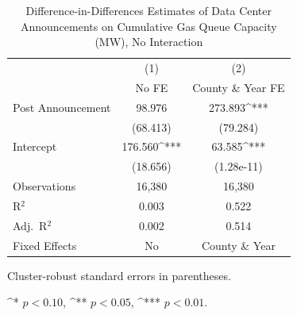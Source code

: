 \documentclass[sigconf,authordraft]{acmart}
\newcommand{\sym}[1]{^{#1}}
\begin{document}
\begin{table}[htbp]\centering
\caption{Difference-in-Differences Estimates of Data Center Announcements on Cumulative Gas Queue Capacity (MW), No Interaction}
\begin{threeparttable}
\begin{tabular}{lcc}
\toprule
& (1) & (2) \\
& No FE & County \& Year FE \\
\midrule
Post Announcement & 98.976 & 273.893\sym{***} \\
& (68.413) & (79.284) \\
Intercept & 176.560\sym{***} & 63.585\sym{***} \\
& (18.656) & (1.28e-11) \\
\midrule
Observations & 16,380 & 16,380 \\
R$^2$ & 0.003 & 0.522 \\
Adj.\ R$^2$ & 0.002 & 0.514 \\
Fixed Effects & No & County \& Year \\
\bottomrule
\end{tabular}
\begin{tablenotes}[flushleft]
\footnotesize
\item Cluster-robust standard errors in parentheses. 
\item \sym{*} $p<0.10$, \sym{**} $p<0.05$, \sym{***} $p<0.01$. 
\end{tablenotes}
\end{threeparttable}
\label{DIDNGInteract}
\end{table}
\end{document}
